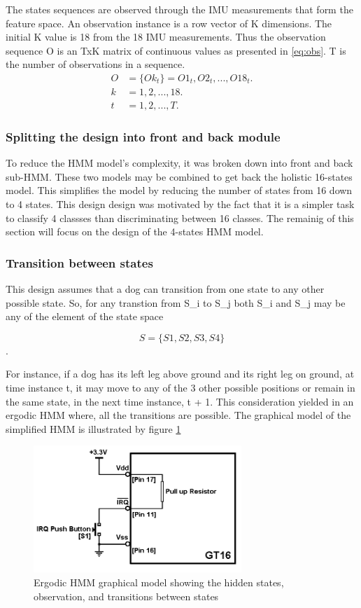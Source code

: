 The states sequences are observed through the IMU measurements that form the feature space. An observation instance is a row vector of K dimensions. The initial K value is 18 from the 18 IMU measurements.
Thus the observation sequence O is an TxK matrix of continuous values as presented in \ref{eq:obs}. T is the number of observations in a sequence.
\begin{align} \label{eq:obs}
O &= \{Ok_t\} = O1_t, O2_t, ..., O18_t. \\
k &= 1, 2, ..., 18. \\
t &= 1, 2, ..., T.
\end{align}


\subsubsection{Splitting the design into front and back module}
To reduce the HMM model's complexity, it was broken down into front and back sub-HMM. These two models may be combined to get back the holistic 16-states model.
This simplifies the model by reducing the number of states from 16 down to 4 states. 
This design design was motivated by the fact that it is a simpler task to classify 4 classses than discriminating between 16 classes. The remainig of this section will focus on the design of the 4-states HMM model.
 
\subsubsection{Transition between states}
This design assumes that a dog can transition from one state to any other possible state. So, for any transtion from S\_{i} to S\_{j} both S\_{i} and S\_{j} may be any of the element of the state space 

\[S = \{S1, S2, S3, S4\}\].

For instance, if a dog has its left leg above ground and its right leg on ground, at time instance t, it may move to any of the 3 other possible positions or remain in the same state, in the next time instance, t + 1. 
This consideration yielded in an ergodic HMM where, all the transitions are possible. The graphical model of the simplified HMM is illustrated by figure \ref{fig:model}

\begin{figure}[ht]
	\centering
	\includegraphics[width=0.7\textwidth]{model.png}
	\caption{Ergodic HMM graphical model showing the hidden states, observation, and transitions between states}
	\label{fig:model}
\end{figure}

